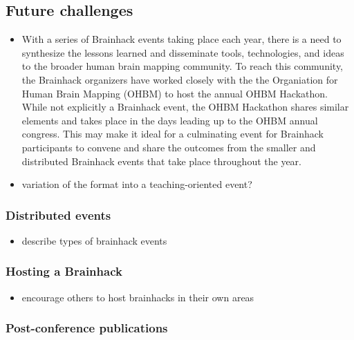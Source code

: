 \documentclass[11pt]{bmc_article_s50}
\providecommand{\tightlist}{%
  \setlength{\itemsep}{0pt}\setlength{\parskip}{0pt}}
\begin{document}
\subsection{Future challenges}\label{future-challenges}

\begin{itemize}
\tightlist
\item
  With a series of Brainhack events taking place each year, there is a need
  to synthesize the lessons learned and disseminate tools, technologies, and
  ideas to the broader human brain mapping community. To reach this community,
  the Brainhack organizers have worked closely with the the Organiation for 
  Human Brain Mapping (OHBM) to host the annual OHBM Hackathon. While not 
  explicitly a Brainhack event, the OHBM Hackathon shares similar elements and
  takes place in the days leading up to the OHBM annual congress. This may make it 
  ideal for a culminating event for Brainhack participants to convene and share
  the outcomes from the smaller and distributed Brainhack events that take place
  throughout the year.
\item
  variation of the format into a teaching-oriented event?
\end{itemize}

\subsubsection{Distributed events}\label{distributed-events}

\begin{itemize}
\tightlist
\item
  describe types of brainhack events
\end{itemize}

\subsubsection{Hosting a Brainhack}\label{hosting-a-brainhack}

\begin{itemize}
\tightlist
\item
  encourage others to host brainhacks in their own areas
\end{itemize}

\subsubsection{Post-conference
publications}\label{post-conference-publications}
\end{document}
